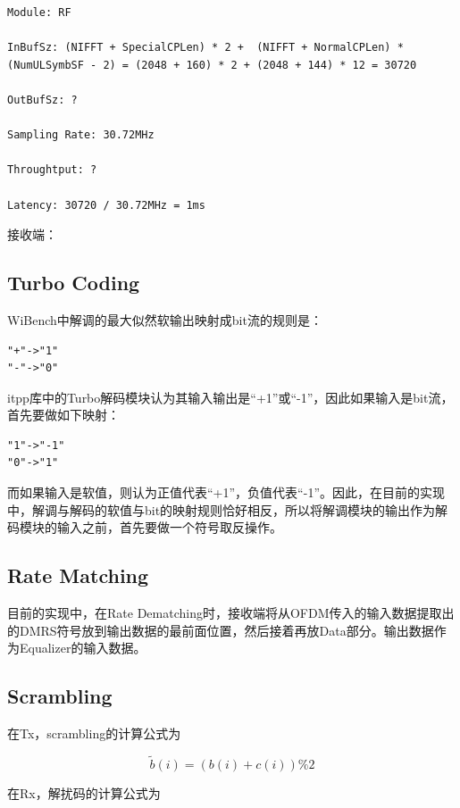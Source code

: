 \documentclass[titlepage]{article}
\numberwithin{figure}{section}
\numberwithin{equation}{section}
\begin{document}
\begin{verbatim}
Module: RF

InBufSz: (NIFFT + SpecialCPLen) * 2 +  (NIFFT + NormalCPLen) * (NumULSymbSF - 2) = (2048 + 160) * 2 + (2048 + 144) * 12 = 30720 

OutBufSz: ?

Sampling Rate: 30.72MHz

Throughtput: ?

Latency: 30720 / 30.72MHz = 1ms
\end{verbatim}

接收端：


\subsection{Turbo Coding}

WiBench中解调的最大似然软输出映射成bit流的规则是：

\begin{verbatim}
"+"->"1"
"-"->"0"
\end{verbatim}

itpp库中的Turbo解码模块认为其输入输出是“+1”或“-1”，因此如果输入是bit流，首先要做如下映射：

\begin{verbatim}
"1"->"-1"
"0"->"1"
\end{verbatim}

而如果输入是软值，则认为正值代表“+1”，负值代表“-1”。因此，在目前的实现中，解调与解码的软值与bit的映射规则恰好相反，所以将解调模块的输出作为解码模块的输入之前，首先要做一个符号取反操作。

\subsection{Rate Matching}

目前的实现中，在Rate Dematching时，接收端将从OFDM传入的输入数据提取出的DMRS符号放到输出数据的最前面位置，然后接着再放Data部分。输出数据作为Equalizer的输入数据。

\subsection{Scrambling}

在Tx，scrambling的计算公式为

\begin{displaymath}
  {\tilde b(i)}=(b(i)+c(i))\%2
\end{displaymath}

在Rx，解扰码的计算公式为
\end{document}
